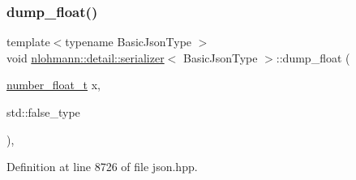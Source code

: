 \subsubsection{\texorpdfstring{dump\+\_\+float()}{dump\_float()}\hspace{0.1cm}{\footnotesize\ttfamily [3/3]}}
{\footnotesize\ttfamily template$<$typename Basic\+Json\+Type $>$ \\
void \hyperlink{classnlohmann_1_1detail_1_1serializer}{nlohmann\+::detail\+::serializer}$<$ Basic\+Json\+Type $>$\+::dump\+\_\+float (\begin{DoxyParamCaption}\item[{\hyperlink{classnlohmann_1_1detail_1_1serializer_a460c6794fbabbb2ae83380e987a6c030}{number\+\_\+float\+\_\+t}}]{x,  }\item[{std\+::false\+\_\+type}]{ }\end{DoxyParamCaption})\hspace{0.3cm}{\ttfamily [inline]}, {\ttfamily [private]}}



Definition at line 8726 of file json.\+hpp.


